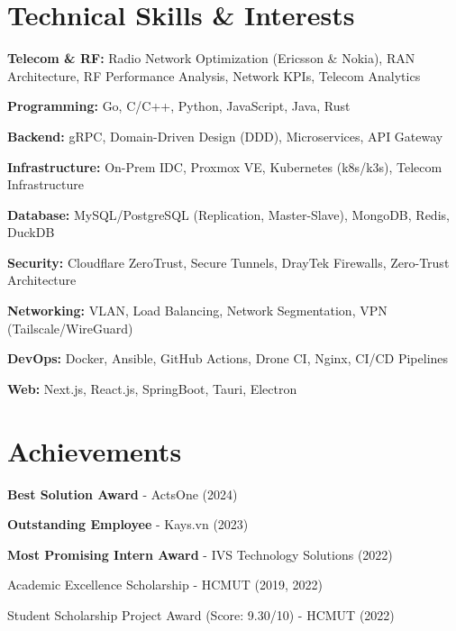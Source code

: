 \section{Technical Skills \& Interests}
\begin{onecolentry}
\begin{highlights}
    \item \textbf{Telecom \& RF:} Radio Network Optimization (Ericsson \& Nokia), RAN Architecture, RF Performance Analysis, Network KPIs, Telecom Analytics
    \item \textbf{Programming:} Go, C/C++, Python, JavaScript, Java, Rust
    \item \textbf{Backend:} gRPC, Domain-Driven Design (DDD), Microservices, API Gateway
    \item \textbf{Infrastructure:} On-Prem IDC, Proxmox VE, Kubernetes (k8s/k3s), Telecom Infrastructure
    \item \textbf{Database:} MySQL/PostgreSQL (Replication, Master-Slave), MongoDB, Redis, DuckDB
    \item \textbf{Security:} Cloudflare ZeroTrust, Secure Tunnels, DrayTek Firewalls, Zero-Trust Architecture
    \item \textbf{Networking:} VLAN, Load Balancing, Network Segmentation, VPN (Tailscale/WireGuard)
    \item \textbf{DevOps:} Docker, Ansible, GitHub Actions, Drone CI, Nginx, CI/CD Pipelines
    \item \textbf{Web:} Next.js, React.js, SpringBoot, Tauri, Electron
\end{highlights}
\end{onecolentry}

\section{Achievements}
\begin{onecolentry}
    \begin{highlights}
        \item \textbf{Best Solution Award} - ActsOne (2024)
        \item \textbf{Outstanding Employee} - Kays.vn (2023)
        \item \textbf{Most Promising Intern Award} - IVS Technology Solutions (2022)
        \item Academic Excellence Scholarship - HCMUT (2019, 2022)
        \item Student Scholarship Project Award (Score: 9.30/10) - HCMUT (2022)
    \end{highlights}
\end{onecolentry}
